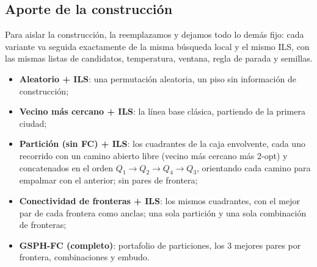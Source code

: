\documentclass[runningheads]{llncs}
\begin{document}
\subsection{Aporte de la construcción}
\label{sec:ablation}

Para aislar la construcción, la reemplazamos y dejamos todo lo demás
fijo: cada variante va seguida exactamente de la misma búsqueda local y
el mismo ILS, con las mismas listas de candidatos, temperatura, ventana,
regla de parada y semillas.
\begin{itemize}
  \item \textbf{Aleatorio + ILS}: una permutación aleatoria, un piso sin
    información de construcción;
  \item \textbf{Vecino más cercano + ILS}: la línea base clásica,
    partiendo de la primera ciudad;
  \item \textbf{Partición (sin FC) + ILS}: los cuadrantes de la caja
    envolvente, cada uno recorrido con un camino abierto libre (vecino
    más cercano más 2-opt) y concatenados en el orden
    $Q_1\!\to\!Q_2\!\to\!Q_4\!\to\!Q_3$, orientando cada camino para
    empalmar con el anterior; sin pares de frontera;
  \item \textbf{Conectividad de fronteras + ILS}: los mismos cuadrantes,
    con el mejor par de cada frontera como anclas; una sola partición y
    una sola combinación de fronteras;
  \item \textbf{GSPH-FC (completo)}: portafolio de particiones, los 3
    mejores pares por frontera, combinaciones y embudo.
\end{itemize}
\end{document}
